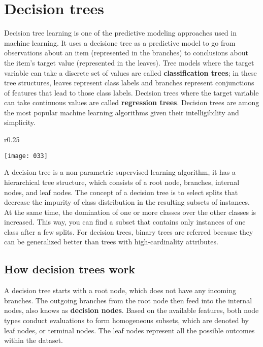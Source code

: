 \chapter{Decision trees}

Decision tree learning is one of the predictive modeling approaches used in machine learning. It uses a decisione tree as a predictive model to go from observations about an item (represented in the branches) to conclusions about the item's target value (represented in the leaves). Tree models where the target variable can take a discrete set of values are called \textbf{classification trees}; in these tree structures, leaves represent class labels and branches represent conjunctions of features that lead to those class labels. Decision trees where the target variable can take continuous values are called \textbf{regression trees}. Decision trees are among the most popular machine learning algorithms given their intelligibility and simplicity.

\begin{wrapfigure}{r}{0.25\textwidth}
    \begin{center}
        \texttt{[image: 033]}
        \label{fig:033}
    \end{center}
    \caption{}
    \vspace{-40pt}
\end{wrapfigure}

A decision tree is a non-parametric supervised learning algorithm, it has a hierarchical tree structure, which consists of a root node, branches, internal nodes, and leaf nodes. The concept of a decision tree is to select splits that decrease the impurity of class distribution in the resulting subsets of instances. At the same time, the domination of one or more classes over the other classes is increased. This way, you can find a subset that contains only instances of one class after a few splits. For decision trees, binary trees are referred because they can be generalized better than trees with high-cardinality attributes.

\section{How decision trees work}
A decision tree starts with a root node, which does not have any incoming branches. The outgoing branches from the root node then feed into the internal nodes, also knows as \textbf{decision nodes}. Based on the available features, both node types conduct evaluations to form homogeneous subsets, which are denoted by leaf nodes, or terminal nodes. The leaf nodes represent all the possible outcomes within the dataset.

